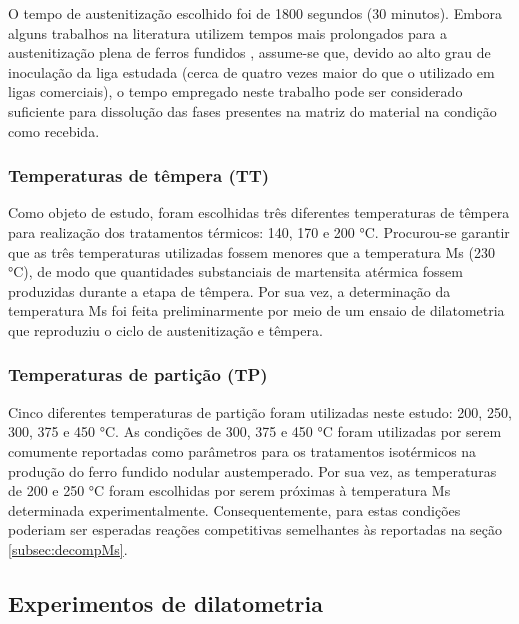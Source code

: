 O tempo de austenitização escolhido foi de 1800 segundos (30 minutos). Embora alguns trabalhos na literatura utilizem tempos mais prolongados para a austenitização plena de ferros fundidos \cite{Trudel1997}, assume-se que, devido ao alto grau de inoculação da liga estudada (cerca de quatro vezes maior do que o utilizado em ligas comerciais), o tempo empregado neste trabalho pode ser considerado suficiente para dissolução das fases presentes na matriz do material na condição como recebida.


\subsubsection*{Temperaturas de t\^{e}mpera (TT)} 

Como objeto de estudo, foram escolhidas três diferentes temperaturas de têmpera para realização dos tratamentos térmicos: 140, 170 e 200 °C. Procurou-se garantir que as três temperaturas utilizadas fossem menores que a temperatura Ms (230 °C), de modo que quantidades substanciais de martensita atérmica fossem produzidas durante a etapa de têmpera. Por sua vez, a determinação da temperatura Ms foi feita preliminarmente por meio de um ensaio de dilatometria que reproduziu o ciclo de austenitização e têmpera.

\subsubsection*{Temperaturas de parti\c{c}\~{a}o (TP)} 

Cinco diferentes temperaturas de partição foram utilizadas neste estudo: 200, 250, 300, 375 e 450 °C. As condições de 300, 375 e 450 °C foram utilizadas por serem comumente reportadas como parâmetros para os tratamentos isotérmicos na produção do ferro fundido nodular austemperado. %
Por sua vez, as temperaturas de 200 e 250 °C foram escolhidas por serem próximas à temperatura Ms determinada experimentalmente. Consequentemente, para estas condições poderiam ser esperadas reações competitivas semelhantes às reportadas na seção \ref{subsec:decompMs}.

\subsection{Experimentos de dilatometria}


